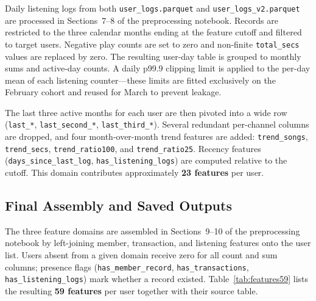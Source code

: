 \documentclass{article}
\begin{document}
Daily listening logs from both \texttt{user\_logs.parquet} and \texttt{user\_logs\_v2.parquet} are processed in Sections~7--8 of the preprocessing notebook. Records are restricted to the three calendar months ending at the feature cutoff and filtered to target users. Negative play counts are set to zero and non-finite \texttt{total\_secs} values are replaced by zero. The resulting user-day table is grouped to monthly sums and active-day counts. A daily p99.9 clipping limit is applied to the per-day mean of each listening counter—these limits are fitted exclusively on the February cohort and reused for March to prevent leakage.

The last three active months for each user are then pivoted into a wide row (\texttt{last\_*}, \texttt{last\_second\_*}, \texttt{last\_third\_*}). Several redundant per-channel columns are dropped, and four month-over-month trend features are added: \texttt{trend\_songs}, \texttt{trend\_secs}, \texttt{trend\_ratio100}, and \texttt{trend\_ratio25}. Recency features (\texttt{days\_since\_last\_log}, \texttt{has\_listening\_logs}) are computed relative to the cutoff. This domain contributes approximately \textbf{23 features} per user.

\subsection{Final Assembly and Saved Outputs}

The three feature domains are assembled in Sections~9--10 of the preprocessing notebook by left-joining member, transaction, and listening features onto the user list. Users absent from a given domain receive zero for all count and sum columns; presence flags (\texttt{has\_member\_record}, \texttt{has\_transactions}, \texttt{has\_listening\_logs}) mark whether a record existed. Table~\ref{tab:features59} lists the resulting \textbf{59 features} per user together with their source table.
\end{document}
